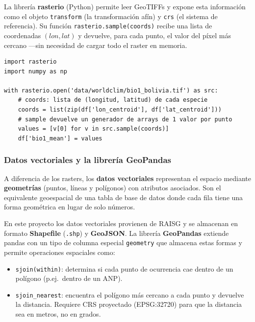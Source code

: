 \documentclass[12pt,a4paper]{article}
\begin{document}
La librería \textbf{rasterio} (Python) permite leer GeoTIFFs y expone esta información
como el objeto \texttt{transform} (la transformación afín) y \texttt{crs} (el sistema
de referencia).  Su función \texttt{rasterio.sample(coords)} recibe una lista de
coordenadas $(lon, lat)$ y devuelve, para cada punto, el valor del píxel más cercano
---sin necesidad de cargar todo el raster en memoria.

\begin{samepage}
\begin{lstlisting}[caption={Extracción de valores raster con rasterio.sample.}]
import rasterio
import numpy as np

with rasterio.open('data/worldclim/bio1_bolivia.tif') as src:
    # coords: lista de (longitud, latitud) de cada especie
    coords = list(zip(df['lon_centroid'], df['lat_centroid']))
    # sample devuelve un generador de arrays de 1 valor por punto
    values = [v[0] for v in src.sample(coords)]
    df['bio1_mean'] = values
\end{lstlisting}
\end{samepage}

\subsubsection{Datos vectoriales y la librería GeoPandas}

A diferencia de los rasters, los \textbf{datos vectoriales} representan el espacio
mediante \textbf{geometrías} (puntos, líneas y polígonos) con atributos asociados.
Son el equivalente geoespacial de una tabla de base de datos donde cada fila tiene una
forma geométrica en lugar de solo números.

En este proyecto los datos vectoriales provienen de RAISG y se almacenan en formato
\textbf{Shapefile} (\texttt{.shp}) y \textbf{GeoJSON}.
La librería \textbf{GeoPandas} extiende pandas con un tipo de columna especial
\texttt{geometry} que almacena estas formas y permite operaciones espaciales como:

\begin{itemize}[nosep]
  \item \texttt{sjoin(within)}: determina si cada punto de ocurrencia cae dentro de un
        polígono (p.ej.\ dentro de un ANP).
  \item \texttt{sjoin\_nearest}: encuentra el polígono más cercano a cada punto y
        devuelve la distancia.  Requiere CRS proyectado (EPSG:32720) para que la
        distancia sea en metros, no en grados.
\end{itemize}
\end{document}
